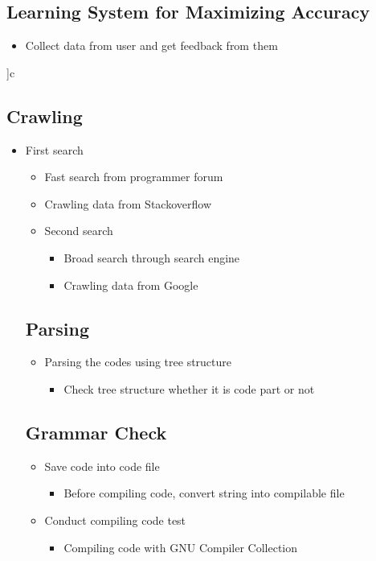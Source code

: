 \documentclass[conference]{IEEEtran}
\begin{document}
\begin{itemize}
\begin{itemize}
\begin{itemize}
\subsection{Learning System for Maximizing Accuracy}
\begin{itemize}
  \item Collect data from user and get feedback from them
\end{itemize}
\textit{ }

]c
\subsection{Crawling}
\begin{itemize}
  \item First search
  \begin{itemize}
    \item Fast search from programmer forum
    \item Crawling data from Stackoverflow
  \item Second search
  \begin{itemize}
    \item Broad search through search engine
    \item Crawling data from Google
  \end{itemize}
\end{itemize}
\textit{ }


\subsection{Parsing}
\begin{itemize}
  \item Parsing the codes using tree structure
  \begin{itemize}
    \item Check tree structure whether it is code part or not
  \end{itemize}
\end{itemize}
\textit{ }


\subsection{Grammar Check}
\begin{itemize}
  \item Save code into code file
  \begin{itemize}
    \item Before compiling code, convert string into compilable file
  \end{itemize}
  \item Conduct compiling code test
  \begin{itemize}
    \item Compiling code with GNU Compiler Collection
  \end{itemize}
\end{itemize}
\textit{ }



\end{itemize}
\end{itemize}
\end{itemize}
\end{itemize}
\end{document}
